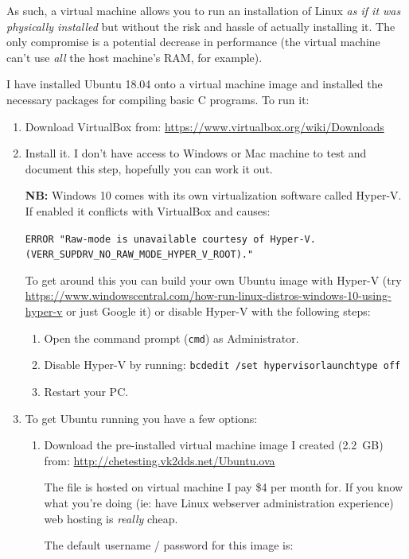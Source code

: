 \documentclass{lab}
\begin{document}
As such, a virtual machine allows you to run an installation of Linux \textit{as if it was physically installed} but without the risk and hassle of actually installing it. The only compromise is a potential decrease in performance (the virtual machine can't use \textit{all} the host machine's RAM, for example).

I have installed Ubuntu 18.04 onto a virtual machine image and installed the necessary packages for compiling basic C programs. To run it:

\begin{enumerate}
\item Download VirtualBox from: \url{https://www.virtualbox.org/wiki/Downloads}
\item Install it. I don't have access to Windows or Mac machine to test and document this step, hopefully you can work it out.

\textbf{NB:} Windows 10 comes with its own virtualization software called Hyper-V. If enabled it conflicts with VirtualBox and causes:

\texttt{ERROR "Raw-mode is unavailable courtesy of Hyper-V.\\	 (VERR\_SUPDRV\_NO\_RAW\_MODE\_HYPER\_V\_ROOT)."}

To get around this you can build your own Ubuntu image with Hyper-V (try \url{https://www.windowscentral.com/how-run-linux-distros-windows-10-using-hyper-v} or just Google it) or disable Hyper-V with the following steps:

	\begin{enumerate}
		\item Open the command prompt (\texttt{cmd}) as Administrator.
		\item Disable Hyper-V by running: \texttt{bcdedit /set hypervisorlaunchtype off}
		\item Restart your PC.
	\end{enumerate}

\item To get Ubuntu running you have a few options:
	\begin{enumerate}
		\item Download the pre-installed virtual machine image I created (2.2~GB) from: \url{http://chetesting.vk2dds.net/Ubuntu.ova}

The file is hosted on virtual machine I pay \$4 per month for. If you know what you're doing (ie: have Linux webserver administration experience) web hosting is \textit{really} cheap.

The default username / password for this image is:


\end{enumerate}
\end{enumerate}
\end{document}
